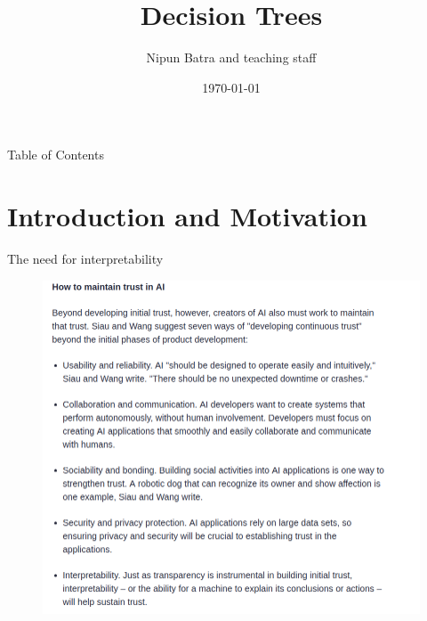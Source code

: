 \documentclass[usenames,dvipsnames]{beamer}
\title{Decision Trees}
\date{\today}
\author{Nipun Batra and teaching staff}
\institute{IIT Gandhinagar}
\begin{document}
	\maketitle
	
	\begin{frame}{Table of Contents}
		\tableofcontents[hideallsubsections]
	\end{frame}
	
	\section{Introduction and Motivation}
	
\begin{frame}{The need for interpretability}
	\begin{figure}
		\centering
		\includegraphics[scale=0.32]{../assets/decision-trees/diagrams/interpretability}
		\label{fig:interpretability}
	\end{figure}
	
\end{frame}
	
\end{document}
